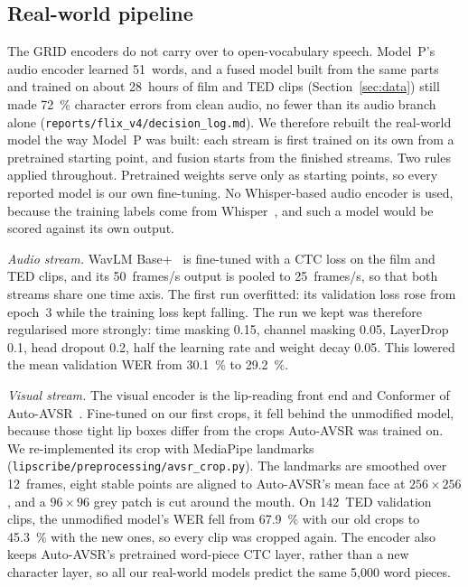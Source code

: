 \subsection{Real-world pipeline}
\label{sec:pipelines-real}
The GRID encoders do not carry over to open-vocabulary speech. Model~P's audio encoder learned
51~words, and a fused model built from the same parts and trained on about 28~hours of film and
TED clips (Section~\ref{sec:data}) still made 72~\% character errors from clean audio, no fewer
than its audio branch alone (\texttt{reports/flix\_v4/decision\_log.md}). We therefore rebuilt the
real-world model the way Model~P was built: each stream is first trained on its own from a
pretrained starting point, and fusion starts from the finished streams. Two rules applied
throughout. Pretrained weights serve only as starting points, so every reported model is our own
fine-tuning. No Whisper-based audio encoder is used, because the training labels come from
Whisper~\cite{radford2023whisper}, and such a model would be scored against its own output.

\textit{Audio stream.} WavLM Base+~\cite{chen2022wavlm} is fine-tuned with a CTC loss on the film
and TED clips, and its 50~frames/s output is pooled to 25~frames/s, so that both streams share
one time axis. The first run overfitted: its validation loss rose from epoch~3 while the training
loss kept falling. The run we kept was therefore regularised more strongly: time masking 0.15,
channel masking 0.05, LayerDrop 0.1, head dropout 0.2, half the learning rate and weight decay
0.05. This lowered the mean validation WER from 30.1~\% to 29.2~\%.

\textit{Visual stream.} The visual encoder is the lip-reading front end and Conformer of
Auto-AVSR~\cite{ma2023}. Fine-tuned on our first crops, it fell behind the unmodified model,
because those tight lip boxes differ from the crops Auto-AVSR was trained on. We re-implemented
its crop with MediaPipe landmarks (\texttt{lipscribe/preprocessing/avsr\_crop.py}). The landmarks
are smoothed over 12~frames, eight stable points are aligned to Auto-AVSR's mean face at
$256 \times 256$, and a $96 \times 96$ grey patch is cut around the mouth. On 142~TED validation
clips, the unmodified model's WER fell from 67.9~\% with our old crops to 45.3~\% with the new
ones, so every clip was cropped again. The encoder also keeps Auto-AVSR's pretrained word-piece
CTC layer, rather than a new character layer, so all our real-world models predict the same
5,000 word pieces.


